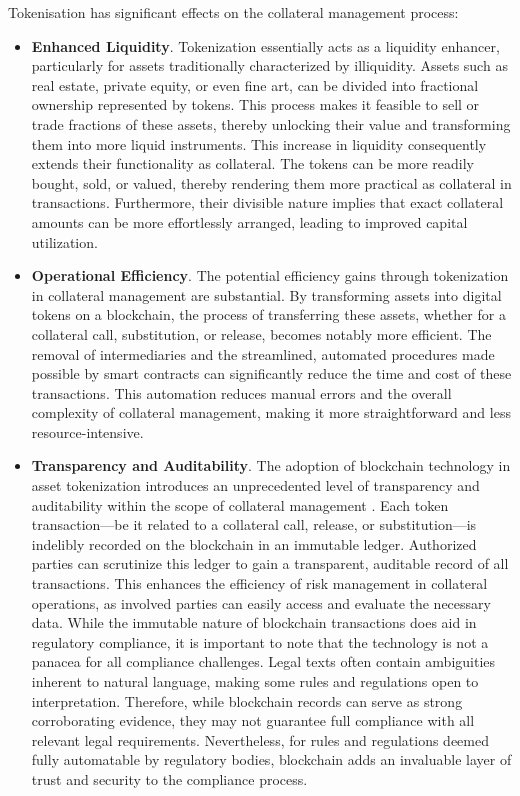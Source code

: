 Tokenisation has significant effects on the collateral management process:

\begin{itemize}
    \item \textbf{Enhanced Liquidity}. Tokenization essentially acts as a liquidity enhancer, particularly for assets traditionally characterized by illiquidity. Assets such as real estate, private equity, or even fine art, can be divided into fractional ownership represented by tokens. This process makes it feasible to sell or trade fractions of these assets, thereby unlocking their value and transforming them into more liquid instruments. This increase in liquidity consequently extends their functionality as collateral. The tokens can be more readily bought, sold, or valued, thereby rendering them more practical as collateral in transactions. Furthermore, their divisible nature implies that exact collateral amounts can be more effortlessly arranged, leading to improved capital utilization.
    
    \item \textbf{Operational Efficiency}. The potential efficiency gains through tokenization in collateral management are substantial. By transforming assets into digital tokens on a blockchain, the process of transferring these assets, whether for a collateral call, substitution, or release, becomes notably more efficient. The removal of intermediaries and the streamlined, automated procedures made possible by smart contracts can significantly reduce the time and cost of these transactions. This automation reduces manual errors and the overall complexity of collateral management, making it more straightforward and less resource-intensive.
    
    \item \textbf{Transparency and Auditability}. The adoption of blockchain technology in asset tokenization introduces an unprecedented level of transparency and auditability within the scope of collateral management \citep{isda_collateral_sc_legal_guidelines}. Each token transaction—be it related to a collateral call, release, or substitution—is indelibly recorded on the blockchain in an immutable ledger. Authorized parties can scrutinize this ledger to gain a transparent, auditable record of all transactions. This enhances the efficiency of risk management in collateral operations, as involved parties can easily access and evaluate the necessary data. While the immutable nature of blockchain transactions does aid in regulatory compliance, it is important to note that the technology is not a panacea for all compliance challenges. Legal texts often contain ambiguities inherent to natural language, making some rules and regulations open to interpretation. Therefore, while blockchain records can serve as strong corroborating evidence, they may not guarantee full compliance with all relevant legal requirements. Nevertheless, for rules and regulations deemed fully automatable by regulatory bodies, blockchain adds an invaluable layer of trust and security to the compliance process.


\end{itemize}
